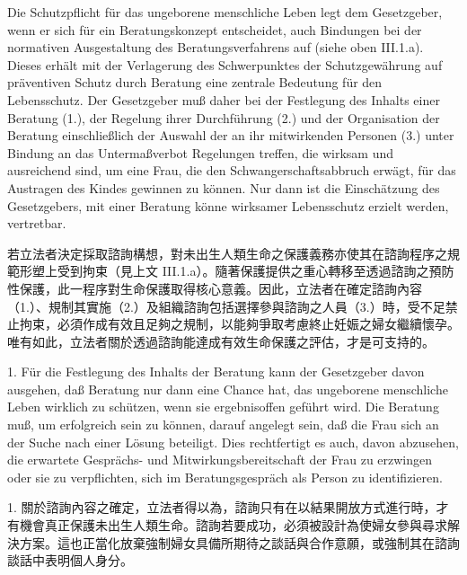 \documentclass[12pt]{article}
\begin{document}
\begin{sourcepara}[title={原文D.107}]
Die Schutzpflicht für das ungeborene menschliche Leben legt dem Gesetzgeber, wenn er sich für ein Beratungskonzept entscheidet, auch Bindungen bei der normativen Ausgestaltung des Beratungsverfahrens auf (siehe oben III.1.a). Dieses erhält mit der Verlagerung des Schwerpunktes der Schutzgewährung auf präventiven Schutz durch Beratung eine zentrale Bedeutung für den Lebensschutz. Der Gesetzgeber muß daher bei der Festlegung des Inhalts einer Beratung (1.), der Regelung ihrer Durchführung (2.) und der Organisation der Beratung einschließlich der Auswahl der an ihr mitwirkenden Personen (3.) unter Bindung an das Untermaßverbot Regelungen treffen, die wirksam und ausreichend sind, um eine Frau, die den Schwangerschaftsabbruch erwägt, für das Austragen des Kindes gewinnen zu können. Nur dann ist die Einschätzung des Gesetzgebers, mit einer Beratung könne wirksamer Lebensschutz erzielt werden, vertretbar.
\end{sourcepara}
\begin{transpara}
若立法者決定採取諮詢構想，對未出生人類生命之保護義務亦使其在諮詢程序之規範形塑上受到拘束（見上文 III.1.a）。隨著保護提供之重心轉移至透過諮詢之預防性保護，此一程序對生命保護取得核心意義。因此，立法者在確定諮詢內容（1.）、規制其實施（2.）及組織諮詢包括選擇參與諮詢之人員（3.）時，受不足禁止拘束，必須作成有效且足夠之規制，以能夠爭取考慮終止妊娠之婦女繼續懷孕。唯有如此，立法者關於透過諮詢能達成有效生命保護之評估，才是可支持的。
\end{transpara}

\begin{sourcepara}[title={原文D.108}]
1. Für die Festlegung des Inhalts der Beratung kann der Gesetzgeber davon ausgehen, daß Beratung nur dann eine Chance hat, das ungeborene menschliche Leben wirklich zu schützen, wenn sie ergebnisoffen geführt wird. Die Beratung muß, um erfolgreich sein zu können, darauf angelegt sein, daß die Frau sich an der Suche nach einer Lösung beteiligt. Dies rechtfertigt es auch, davon abzusehen, die erwartete Gesprächs- und Mitwirkungsbereitschaft der Frau zu erzwingen oder sie zu verpflichten, sich im Beratungsgespräch als Person zu identifizieren.
\end{sourcepara}
\begin{transpara}
1. 關於諮詢內容之確定，立法者得以為，諮詢只有在以結果開放方式進行時，才有機會真正保護未出生人類生命。諮詢若要成功，必須被設計為使婦女參與尋求解決方案。這也正當化放棄強制婦女具備所期待之談話與合作意願，或強制其在諮詢談話中表明個人身分。
\end{transpara}
\end{document}
